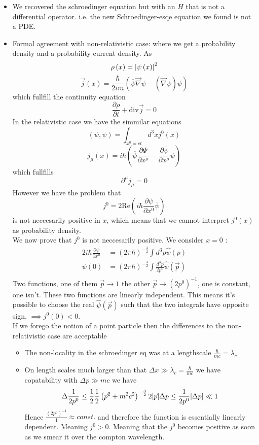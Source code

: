 \documentclass{report}
\begin{document}
\begin{itemize}
  \item We recovered the schroedinger equation but with an $H$ that is not a differential operator. i.e. the new Schroedinger-esqe equation we found is not a PDE.
  \item Formal agreement with non-relativistic case: where we get a probability density and a probability current density. As \[
      \rho\left( x \right) = \abs{\psi\left( x \right) }^2
  \] \[
  \vec{j}\left( x \right) = \frac{\hbar}{2im} \left( \overline{\psi} \vec{\nabla } \psi - \left( \vec{\nabla }\psi \right) \psi \right) 
  \] which fullfill the continuity equation \[
  \frac{\partial \rho}{\partial t} + \text{div} \vec{j} = 0
  \] In the relativistic case we have the simmilar equations 
\[
  \left( \psi, \psi \right) = \int_{x^0=ct} d^3x j^0\left( x \right) 
\] 
  \[
  j_\mu\left( x \right) = i\hbar \left( \overline{\psi} \frac{\partial \Psi}{\partial x^\mu} - \frac{\partial \overline{\psi}}{\partial x^\mu } \psi \right) 
  \] which fullfills \[
  \partial^\mu j_\mu = 0 
  \]
  However we have the problem that \[
    j^0 = 2 \text{Re}\left( i\hbar \frac{\partial \psi}{\partial x^0} \overline{\psi} \right) 
  \] is not neccesarily positive in $x$, which means that we cannot interpret $j^0\left( x \right) $ as probability density.\\
  We now prove that $j^0$ is not neccesarily positive. We consider $x=0$ :
  \begin{align*}
    2i\hbar \frac{\partial \psi}{\partial x^0} &= \left( 2\pi \hbar \right) ^{-\frac{3}{2}} \int d^{3}p \hat{\psi}\left( p \right) \\
    \psi(0) &= \left( 2 \pi \hbar \right) ^{-\frac{3}{2}} \int \frac{d^{3}p}{2 p^0} \hat{\psi}\left( \vec{p} \right)  \\
  \end{align*} Two functions, one of them $\vec{p} \to  1$ the other $\vec{p} \to \left( 2 p^0 \right) ^{-1}$, one is constant, one isn't. These two functions are linearly independent. This means it's possible to choose the real $\hat{\psi}\left( \vec{p} \right) $ such that the two integrals have opposite sign. $\implies j^0\left( 0 \right) < 0$.\\
  If we forego the notion of a point particle then the differences to the non-relativistic case are acceptable
  \begin{itemize}
    \item The non-locality in the schroedinger eq was at a lengthscale $\frac{\hbar}{mc} = \lambda_c$ 
    \item On length scales much larger than that $\Delta x \gg \lambda_c = \frac{\hbar}{mc}$ we have copatability with $\Delta p \gg mc$ we have \[
        \Delta \frac{1}{2 p^0} \le \frac{1}{2} \frac{1}{2} \left( \vec{p}^2 + m^2c^2 \right) ^{-\frac{3}{2}} 2 \abs{\vec{p}} \Delta p \le  \frac{1}{2 p^0} \abs{\Delta p} \ll 1
      \] Hence $\frac{\left( 2p^0 \right) ^{-1}}{1} \approx const.$ and therefore the function is essentially linearly dependent. Meaning $j^0 > 0$. Meaning that the $j^0$ becomes positive as soon as we smear it over the compton wavelength.
  \end{itemize}
\end{itemize}
\end{document}
